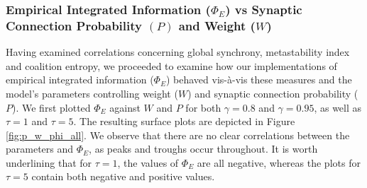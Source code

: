 \documentclass[a4paper,11pt]{article}
\begin{document}
\subsubsection{Empirical Integrated Information ($\Phi_E$) vs Synaptic Connection Probability $(P)$ and Weight ($W$)}
\label{sec:app:snn:res:phi-p-w}
Having examined correlations concerning global synchrony, metastability index and coalition entropy, we proceeded to examine how our implementations of empirical integrated information ($\Phi_E$) behaved vis-\`{a}-vis these measures and the model's parameters controlling weight ($W$) and synaptic connection probability ($P$). We first plotted $\Phi_E$ against $W$ and $P$ for both $\gamma = 0.8$ and $\gamma = 0.95$, as well as $\tau = 1$ and $\tau = 5$. The resulting surface plots are depicted in Figure \ref{fig:p_w_phi_all}. We observe that there are no clear correlations between the parameters and $\Phi_E$, as peaks and troughs occur throughout. It is worth underlining that for $\tau = 1$, the values of $\Phi_E$ are all negative, whereas the plots for $\tau = 5$ contain both negative and positive values.
\end{document}
